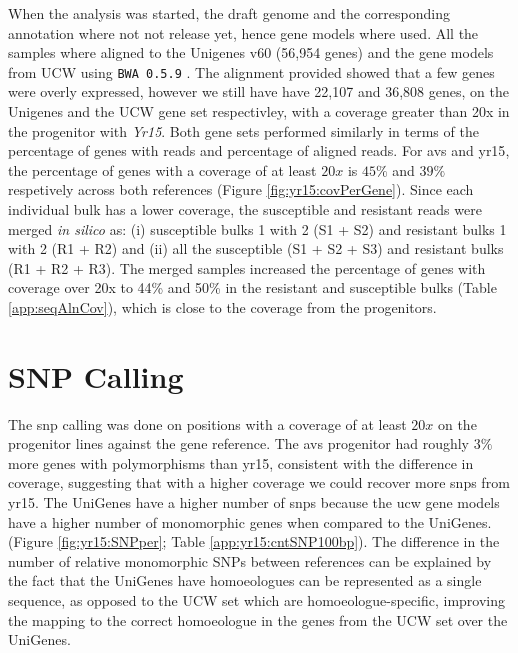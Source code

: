 When the analysis was started, the draft genome and the corresponding annotation where not not release yet, hence gene models where used. 
All the samples where aligned to the Unigenes v60 (56,954 genes) and the gene models from UCW \citep{Krasileva2013} using \verb|BWA 0.5.9| \citep{Li2009}. 
The alignment provided showed that a few genes were overly expressed, however we still have have 22,107 and 36,808 genes, on the Unigenes and the UCW gene set respectivley,  with a coverage greater than 20x in the progenitor with \textit{Yr15}. 
Both gene sets performed similarly in terms of the percentage of genes with reads and percentage of aligned reads. 
For \gls{avs} and \gls{yr15}, the percentage of genes with a coverage of at least $20x$ is $45\%$ and $39\%$ respetively across both references (Figure \ref{fig:yr15:covPerGene}).
Since each individual bulk has a lower coverage, the susceptible and resistant reads were merged \textit{in silico} as: (i) susceptible bulks 1 with 2 (S1 + S2) and resistant bulks 1 with 2 (R1 + R2) and (ii) all the susceptible (S1 + S2 + S3) and resistant bulks (R1 + R2 + R3). 
The merged samples increased the percentage of genes with coverage over 20x  to 44\% and 50\% in the resistant and susceptible bulks (Table \ref{app:seqAlnCov}), which is close to the coverage from the progenitors.

\section{SNP Calling}

The \acrshort{snp} calling was done on positions with a coverage of at least $20x$ on the progenitor lines against the gene reference. The \acrshort{avs} progenitor had roughly $3\%$ more genes with polymorphisms than \acrshort{yr15}, consistent with the difference in coverage, suggesting that with a higher coverage we could recover more \acrshort{snp}s from \acrshort{yr15}.
The UniGenes have a higher number of \acrshort{snp}s because the \acrshort{ucw} gene models have a higher number of monomorphic genes when compared to the UniGenes. (Figure {\ref{fig:yr15:SNPper}}; Table \ref{app:yr15:cntSNP100bp}). 
The difference in the number of relative monomorphic SNPs between references can be explained by the fact that the UniGenes have homoeologues can be represented as a single sequence, as opposed to the UCW set which are homoeologue-specific, improving the mapping to the correct homoeologue in the genes from the UCW set over the UniGenes.




